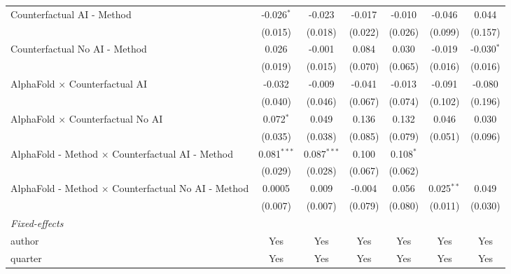 \begin{tabular}{lcccccc}
   Counterfactual AI - Method                                 & -0.026$^{*}$   & -0.023        & -0.017       & -0.010      & -0.046       & 0.044\\   
                                                              & (0.015)        & (0.018)       & (0.022)      & (0.026)     & (0.099)      & (0.157)\\   
   Counterfactual No AI - Method                              & 0.026          & -0.001        & 0.084        & 0.030       & -0.019       & -0.030$^{*}$\\   
                                                              & (0.019)        & (0.015)       & (0.070)      & (0.065)     & (0.016)      & (0.016)\\   
   AlphaFold $\times$ Counterfactual AI                       & -0.032         & -0.009        & -0.041       & -0.013      & -0.091       & -0.080\\   
                                                              & (0.040)        & (0.046)       & (0.067)      & (0.074)     & (0.102)      & (0.196)\\   
   AlphaFold $\times$ Counterfactual No AI                    & 0.072$^{*}$    & 0.049         & 0.136        & 0.132       & 0.046        & 0.030\\   
                                                              & (0.035)        & (0.038)       & (0.085)      & (0.079)     & (0.051)      & (0.096)\\   
   AlphaFold - Method $\times$ Counterfactual AI - Method     & 0.081$^{***}$  & 0.087$^{***}$ & 0.100        & 0.108$^{*}$ &              &   \\   
                                                              & (0.029)        & (0.028)       & (0.067)      & (0.062)     &              &   \\   
   AlphaFold - Method $\times$ Counterfactual No AI - Method  & 0.0005         & 0.009         & -0.004       & 0.056       & 0.025$^{**}$ & 0.049\\   
                                                              & (0.007)        & (0.007)       & (0.079)      & (0.080)     & (0.011)      & (0.030)\\   
   \midrule
   \emph{Fixed-effects}\\
   author                                                     & Yes            & Yes           & Yes          & Yes         & Yes          & Yes\\  
   quarter                                                    & Yes            & Yes           & Yes          & Yes         & Yes          & Yes\\  

\end{tabular}
